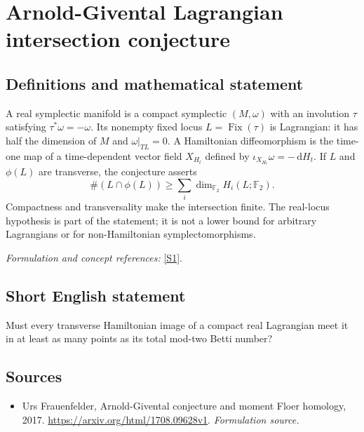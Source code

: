 \documentclass[11pt]{article}
\begin{document}
\section*{\texorpdfstring{Arnold-Givental Lagrangian intersection conjecture}{Arnold-Givental Lagrangian intersection conjecture}}\label{395}
\subsection{Definitions and mathematical statement}
A real symplectic manifold is a compact symplectic $(M,\omega)$ with an involution $\tau$ satisfying $\tau^*\omega=-\omega$. Its nonempty fixed locus $L=\operatorname{Fix}(\tau)$ is Lagrangian: it has half the dimension of $M$ and $\omega|_{TL}=0$. A Hamiltonian diffeomorphism is the time-one map of a time-dependent vector field $X_{H_t}$ defined by $\iota_{X_{H_t}}\omega=-{\,\mathrm{d}} H_t$. If $L$ and $\phi(L)$ are transverse, the conjecture asserts
\[
 \#(L\cap\phi(L))\ge\sum_i\dim_{{\mathbb{F}}_2}H_i(L;{\mathbb{F}}_2).
\]
Compactness and transversality make the intersection finite. The real-locus hypothesis is part of the statement; it is not a lower bound for arbitrary Lagrangians or for non-Hamiltonian symplectomorphisms.
\par\smallskip\textit{Formulation and concept references:} \href{https://arxiv.org/html/1708.09628v1}{[S1]}.

\subsection{Short English statement}
Must every transverse Hamiltonian image of a compact real Lagrangian meet it in at least as many points as its total mod-two Betti number?
\subsection{Sources}
\begin{itemize}
\item[S1]Urs Frauenfelder, Arnold-Givental conjecture and moment Floer homology, 2017.
\url{https://arxiv.org/html/1708.09628v1}.
\textit{Formulation source.}
\end{itemize}
\end{document}
